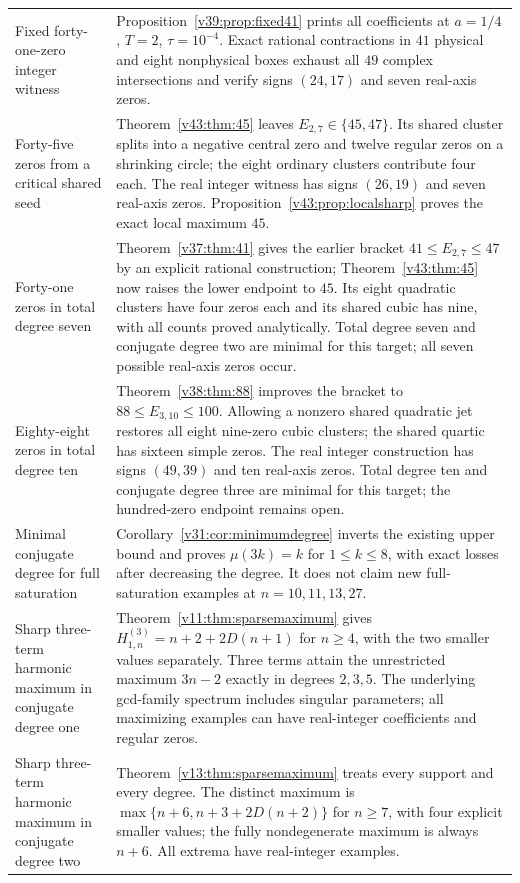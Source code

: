 \documentclass[UTF8,11pt]{ctexart}
\theoremstyle{definition}
\numberwithin{equation}{section}
\begin{document}
\begin{longtable}{@{}>{\raggedright\arraybackslash}p{}>{\raggedright\arraybackslash}p{}@{}}
Fixed forty-one-zero integer witness & Proposition~\ref{v39:prop:fixed41} prints all coefficients at $a=1/4$, $T=2$, $\tau=10^{-4}$. Exact rational contractions in $41$ physical and eight nonphysical boxes exhaust all $49$ complex intersections and verify signs $(24,17)$ and seven real-axis zeros. \\
Forty-five zeros from a critical shared seed & Theorem~\ref{v43:thm:45} leaves $E_{2,7}\in\{45,47\}$. Its shared cluster splits into a negative central zero and twelve regular zeros on a shrinking circle; the eight ordinary clusters contribute four each. The real integer witness has signs $(26,19)$ and seven real-axis zeros. Proposition~\ref{v43:prop:localsharp} proves the exact local maximum $45$. \\
Forty-one zeros in total degree seven & Theorem~\ref{v37:thm:41} gives the earlier bracket $41\le E_{2,7}\le47$ by an explicit rational construction; Theorem~\ref{v43:thm:45} now raises the lower endpoint to $45$. Its eight quadratic clusters have four zeros each and its shared cubic has nine, with all counts proved analytically. Total degree seven and conjugate degree two are minimal for this target; all seven possible real-axis zeros occur. \\
Eighty-eight zeros in total degree ten & Theorem~\ref{v38:thm:88} improves the bracket to $88\le E_{3,10}\le100$. Allowing a nonzero shared quadratic jet restores all eight nine-zero cubic clusters; the shared quartic has sixteen simple zeros. The real integer construction has signs $(49,39)$ and ten real-axis zeros. Total degree ten and conjugate degree three are minimal for this target; the hundred-zero endpoint remains open. \\
Minimal conjugate degree for full saturation & Corollary~\ref{v31:cor:minimumdegree} inverts the existing upper bound and proves $\mu(3k)=k$ for $1\le k\le8$, with exact losses after decreasing the degree. It does not claim new full-saturation examples at $n=10,11,13,27$. \\
Sharp three-term harmonic maximum in conjugate degree one & Theorem~\ref{v11:thm:sparsemaximum} gives $H^{(3)}_{1,n}=n+2+2D(n+1)$ for $n\ge4$, with the two smaller values separately. Three terms attain the unrestricted maximum $3n-2$ exactly in degrees $2,3,5$. The underlying gcd-family spectrum includes singular parameters; all maximizing examples can have real-integer coefficients and regular zeros. \\
Sharp three-term harmonic maximum in conjugate degree two & Theorem~\ref{v13:thm:sparsemaximum} treats every support and every degree. The distinct maximum is $\max\{n+6,n+3+2D(n+2)\}$ for $n\ge7$, with four explicit smaller values; the fully nondegenerate maximum is always $n+6$. All extrema have real-integer examples. \\

\end{longtable}
\end{document}
